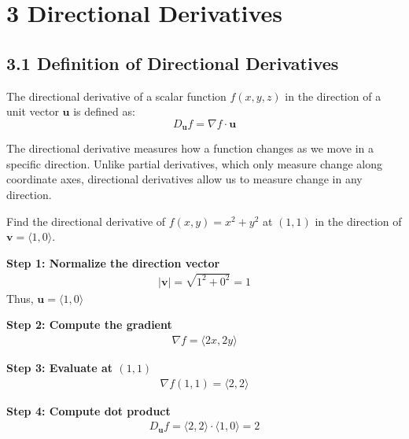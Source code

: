 \section*{3 Directional Derivatives}

\subsection*{3.1 Definition of Directional Derivatives}

\begin{conceptbox}
    The directional derivative of a scalar function $f(x,y,z)$ in the direction of a unit vector $\mathbf{u}$ is defined as:
    \begin{equation*}
        D_{\mathbf{u}} f = \nabla f \cdot \mathbf{u}
    \end{equation*}
\end{conceptbox}

The directional derivative measures how a function changes as we move in a specific direction. Unlike partial derivatives, which only measure change along coordinate axes, directional derivatives allow us to measure change in any direction.

\begin{examplebox}
    Find the directional derivative of $f(x,y)=x^2+y^2$ at $(1,1)$ in the direction of $\mathbf{v}=\langle1,0\rangle$.

    \textbf{Step 1: Normalize the direction vector}
    \begin{align*}
        |\mathbf{v}| = \sqrt{1^2+0^2} = 1
    \end{align*}
    Thus, $\mathbf{u} = \langle1,0\rangle$

    \textbf{Step 2: Compute the gradient}
    \begin{align*}
        \nabla f = \langle 2x, 2y \rangle
    \end{align*}

    \textbf{Step 3: Evaluate at $(1,1)$}
    \begin{align*}
        \nabla f(1,1) = \langle 2,2 \rangle
    \end{align*}

    \textbf{Step 4: Compute dot product}
    \begin{align*}
        D_{\mathbf{u}} f = \langle 2,2 \rangle \cdot \langle 1,0 \rangle = 2
    \end{align*}
\end{examplebox}
